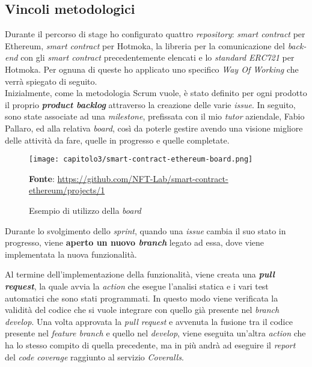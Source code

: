 
\subsection{Vincoli metodologici}
Durante il percorso di stage ho configurato quattro \textit{repository}: \textit{smart contract} per Ethereum, \textit{smart contract} per Hotmoka, la libreria per la comunicazione del \textit{back-end} con gli \textit{smart contract} precedentemente elencati e lo \textit{standard ERC721} per Hotmoka. Per ognuna di queste ho applicato uno specifico \textit{Way Of Working} che verrà spiegato di seguito. \\

Inizialmente, come la metodologia Scrum vuole, è stato definito per ogni prodotto il proprio \textbf{\textit{product backlog}} attraverso la creazione delle varie \textit{issue}. In seguito, sono state associate ad una \textit{milestone}, prefissata con il mio \textit{tutor} aziendale, Fabio Pallaro, ed alla relativa \textit{board}, così da poterle gestire avendo una visione migliore delle attività da fare, quelle in progresso e quelle completate.

\clearpage
\begin{figure}[h!]
  \centering
  \texttt{[image: capitolo3/smart-contract-ethereum-board.png]}
  \caption{Esempio di utilizzo della \textit{board}}
  \textbf{Fonte}: \href{https://github.com/NFT-Lab/smart-contract-ethereum/projects/1}{https://github.com/NFT-Lab/smart-contract-ethereum/projects/1}
\end{figure}

Durante lo svolgimento dello \textit{sprint}, quando una \textit{issue} cambia il suo stato in progresso, viene \textbf{aperto un nuovo \textit{branch}} legato ad essa, dove viene implementata la nuova funzionalità.

Al termine dell'implementazione della funzionalità, viene creata una \textbf{\textit{pull request}}, la quale avvia la \textit{action} che esegue l'analisi statica e i vari test automatici che sono stati programmati. In questo modo viene verificata la validità del codice che si vuole integrare con quello già presente nel \textit{branch develop}. Una volta approvata la \textit{pull request} e avvenuta la fusione tra il codice presente nel \textit{feature branch} e quello nel \textit{develop}, viene eseguita un'altra \textit{action} che ha lo stesso compito di quella precedente, ma in più andrà ad eseguire il \textit{report} del \textit{code coverage} raggiunto al servizio \textit{Coveralls}.


